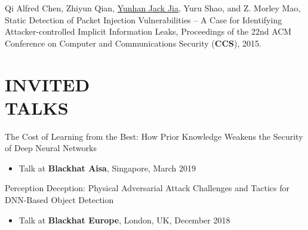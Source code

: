 \documentclass[margin]{res}
\begin{document}
\begin{resume}
Qi Alfred Chen, Zhiyun Qian, \underline{Yunhan Jack Jia}, Yuru Shao, and Z. Morley Mao, Static Detection of Packet Injection
Vulnerabilities -- A Case for Identifying Attacker-controlled Implicit Information Leaks, Proceedings of the 22nd ACM
Conference on Computer and Communications Security (\textbf{CCS}), 2015. \href{http://web.eecs.umich.edu/\~jackjia/material/static\_ccs15.pdf}{\color{blue}{[PDF]}}

\iffalse
\section{POSTERS/DEMOS}

\underline{Yunhan Jack Jia}, Qi Alfred Chen, and Z. Morley Mao, VoLTE Data Free-Ride Attack: A Case of Exploiting the Unprotected Voice Channel, Poster in 24th USENIX Security Symposium (Security), 2015.

Qi Alfred Chen, Zhiyun Qian, \underline{Yunhan Jack Jia}, Yuru Shao, and Z. Morley Mao, PacketGuardian: Systematic Detection of
Packet Injection Vulnerabilities using Precise Static Analysis, Poster in 24th USENIX Security Symposium (Security), 2015.

\underline{Yunhan Jack Jia}, Yihua Guo, Z. Morley Mao, Sung-Ju Lee, Collaborative DoS Attack against Cloud-hosted Web Services, Poster in 23th USENIX Security Symposium (Security), 2014. 

Qi Alfred Chen, \underline{Yunhan Jack Jia}, Zhiyun Qian and Z. Morley Mao, SystemLeakalyzer: Systematically Detecting System Side-Channels, Poster in 23th USENIX Security Symposium (\textbf{Security}), 2014.

Sanae Rosen, Hongyi Yao, Ashkan Nikravesh, \underline{Yunhan Jack Jia}, David Choffnes, Z Morley Mao, Demo: mapping global mobile performance trends with mobilyzer and mobiperf (\textbf{MobiSys}), 2014
\fi

\section{INVITED\\ TALKS}


The Cost of Learning from the Best: How Prior Knowledge Weakens the Security of Deep Neural Networks
\begin{itemize}
    \item Talk at \textbf{Blackhat Aisa}, Singapore, March 2019
\end{itemize}

Perception Deception: Physical Adversarial Attack Challenges and Tactics for DNN-Based Object Detection
\begin{itemize}
    \item Talk at \textbf{Blackhat Europe}, London, UK, December 2018
\end{itemize}


\end{resume}
\end{document}
